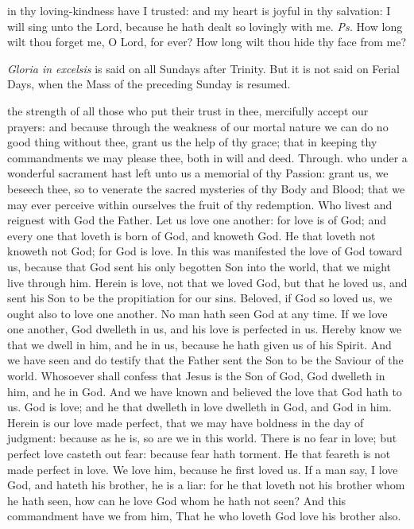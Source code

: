 \introit
{} in thy loving-kindness have I trusted: and my heart is joyful in thy salvation: I will sing unto the Lord, because he hath dealt so lovingly with me. \textit{Ps.} How long wilt thou forget me, O Lord, for ever? How long wilt thou hide thy face from me?
\begin{rubric}
    \emph{Gloria in excelsis} is said on all Sundays after Trinity. But it is not said on Ferial Days, when the Mass of the preceding Sunday is resumed.
\end{rubric}
\collect
{} the strength of all those who put their trust in thee, mercifully accept our prayers: and because through the weakness of our mortal nature we can do no good thing without thee, grant us the help of thy grace; that in keeping thy commandments we may please thee, both in will and deed. Through.
 who under a wonderful sacrament hast left unto us a memorial of thy Passion: grant us, we beseech thee, so to venerate the sacred mysteries of thy Body and Blood; that we may ever perceive within ourselves the fruit of thy redemption. Who livest and reignest with God the Father.
 Let us love one another: for love is of God; and every one that loveth is born of God, and knoweth God. He that loveth not knoweth not God; for God is love. In this was manifested the love of God toward us, because that God sent his only begotten Son into the world, that we might live through him. Herein is love, not that we loved God, but that he loved us, and sent his Son to be the propitiation for our sins. Beloved, if God so loved us, we ought also to love one another. No man hath seen God at any time. If we love one another, God dwelleth in us, and his love is perfected in us. Hereby know we that we dwell in him, and he in us, because he hath given us of his Spirit. And we have seen and do testify that the Father sent the Son to be the Saviour of the world. Whosoever shall confess that Jesus is the Son of God, God dwelleth in him, and he in God. And we have known and believed the love that God hath to us. God is love; and he that dwelleth in love dwelleth in God, and God in him. Herein is our love made perfect, that we may have boldness in the day of judgment: because as he is, so are we in this world. There is no fear in love; but perfect love casteth out fear: because fear hath torment. He that feareth is not made perfect in love. We love him, because he first loved us. If a man say, I love God, and hateth his brother, he is a liar: for he that loveth not his brother whom he hath seen, how can he love God whom he hath not seen? And this commandment have we from him, That he who loveth God love his brother also.

